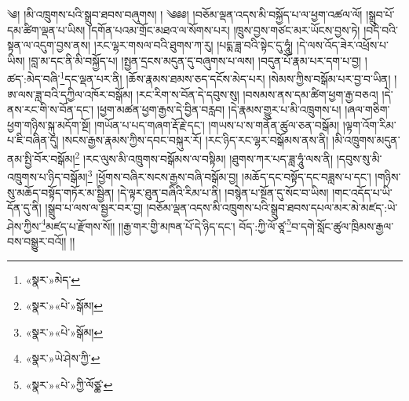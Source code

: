 ༄། །མི་འཁྲུགས་པའི་སྒྲུབ་ཐབས་བཞུགས། ། ༄༅༅། །བཅོམ་ལྡན་འདས་མི་བསྐྱོད་པ་ལ་ཕྱག་འཚལ་ལོ། །སྒྲུབ་པོ་དམ་ཚིག་ལྡན་པ་ཡིས། །དགོན་པའམ་གྲོང་མཐའ་ལ་སོགས་པར། །ཁྲུས་བྱས་གཙང་མར་ཡོངས་བྱས་ཏེ། །བདེ་བའི་སྟན་ལ་འདུག་བྱས་ནས། །རང་ལྷར་གསལ་བའི་ཐུགས་ཀ་རུ། །པདྨ་ཟླ་བའི་སྟེང་དུ་ཧཱུཾ། །དེ་ལས་འོད་ཟེར་འཕྲོས་པ་ཡིས། །བླ་མ་དང་ནི་མི་བསྐྱོད་པ། །སྤྱན་དྲངས་མདུན་དུ་བཞུགས་པ་ལས། །བདུན་པོ་རྣམ་པར་དག་པ་བྱ། །ཚད་:མེད་བཞི་\footnote{«སྣར་»མེད་}དང་ལྡན་པར་ནི། །ཆོས་རྣམས་ཐམས་ཅད་དངོས་མེད་པར། །སེམས་ཀྱིས་བསྒོམ་པར་བྱ་བ་ཡིན། །ཨ་ལས་ཟླ་བའི་དཀྱིལ་འཁོར་བསྒོམ། །རང་རིག་ས་བོན་དེ་དབུས་སུ། །བསམས་ནས་དམ་ཚིག་ཕྱག་རྒྱ་བཅའ། །དེ་ནས་རང་གི་ས་བོན་དང་། །ཕྱག་མཚན་ཕྱག་རྒྱས་དེ་བྱིན་བརླབ། །དེ་རྣམས་གྱུར་པ་མི་འཁྲུགས་པ། །ཞལ་གཅིག་ཕྱག་གཉིས་སྐུ་མདོག་སྔོ། །གཡོན་པ་པད་གཞག་རྡོ་རྗེ་དང་། །གཡས་པ་ས་གནོན་ཚུལ་ཅན་བསྒོམ། །ལྟག་འོག་རིམ་པ་ཇི་བཞིན་དུ། །སངས་རྒྱས་རྣམས་ཀྱིས་དབང་བསྐུར་རོ། །རང་ཉིད་རང་ལྷར་བསྒོམས་ནས་ནི། །མི་འཁྲུགས་མདུན་ནམ་སྤྱི་བོར་བསྒོམ།\footnote{«སྣར་»«པེ་»སྒོམ།} །རང་ལུས་མི་འཁྲུགས་བསྒོམས་ལ་བསྟིམ། །ཐུགས་ཀར་པད་ཟླ་ཧཱུཾ་ལས་ནི། །དབུས་སུ་མི་འཁྲུགས་པ་ཉིད་བསྒོམ།\footnote{«སྣར་»«པེ་»སྒོམ།} །ཕྱོགས་བཞིར་སངས་རྒྱས་བཞི་བསྒོམ་བྱ། །མཆོད་དང་བསྟོད་དང་བཟླས་པ་དང་། །གཉིས་སུ་མཆོད་བསྟོད་གཏོར་མ་སྦྱིན། །དེ་ལྟར་ཐུན་བཞིའི་རིམ་པ་ནི། །བསྙེན་པ་སྔོན་དུ་སོང་བ་ཡིས། །གང་འདོད་པ་ཡི་དོན་དུ་ནི། །སྒྲུབ་པ་ལས་ལ་སྦྱར་བར་བྱ། །བཅོམ་ལྡན་འདས་མི་འཁྲུགས་པའི་སྒྲུབ་ཐབས་དཔལ་མར་མེ་མཛད་:ཡེ་ཤེས་ཀྱིས་\footnote{«སྣར་»ཡེ་ཤེས་ཀྱི་}མཛད་པ་རྫོགས་སོ།། །།རྒྱ་གར་གྱི་མཁན་པོ་དེ་ཉིད་དང་། བོད་:ཀྱི་ལོ་ཙཱ་\footnote{«སྣར་»«པེ་»ཀྱི་ལོཙྪ་}བ་དགེ་སློང་ཚུལ་ཁྲིམས་རྒྱལ་བས་བསྒྱུར་བའོ།། །།